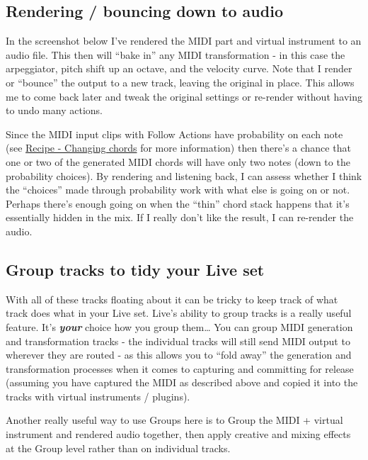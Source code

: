 \documentclass[
  12pt,
  letterpaper,
  oneside,
  open=any]{scrbook}
\begin{document}
\subsection{Rendering / bouncing down to
audio}\label{rendering-bouncing-down-to-audio}

In the screenshot below I've rendered the MIDI part and virtual
instrument to an audio file. This then will ``bake in'' any MIDI
transformation - in this case the arpeggiator, pitch shift up an octave,
and the velocity curve. Note that I render or ``bounce'' the output to a
new track, leaving the original in place. This allows me to come back
later and tweak the original settings or re-render without having to
undo many actions.

Since the MIDI input clips with Follow Actions have probability on each
note (see \hyperref[Chapter-001-Recipe-Changing_Chords]{Recipe -
Changing chords} for more information) then there's a chance that one or
two of the generated MIDI chords will have only two notes (down to the
probability choices). By rendering and listening back, I can assess
whether I think the ``choices'' made through probability work with what
else is going on or not. Perhaps there's enough going on when the
``thin'' chord stack happens that it's essentially hidden in the mix. If
I really don't like the result, I can re-render the audio.

\subsection{Group tracks to tidy your Live
set}\label{group-tracks-to-tidy-your-live-set}

With all of these tracks floating about it can be tricky to keep track
of what track does what in your Live set. Live's ability to group tracks
is a really useful feature. It's \textbf{\emph{your}} choice how you
group them\ldots{} You can group MIDI generation and transformation
tracks - the individual tracks will still send MIDI output to wherever
they are routed - as this allows you to ``fold away'' the generation and
transformation processes when it comes to capturing and committing for
release (assuming you have captured the MIDI as described above and
copied it into the tracks with virtual instruments / plugins).

Another really useful way to use Groups here is to Group the MIDI +
virtual instrument and rendered audio together, then apply creative and
mixing effects at the Group level rather than on individual tracks.
\end{document}
